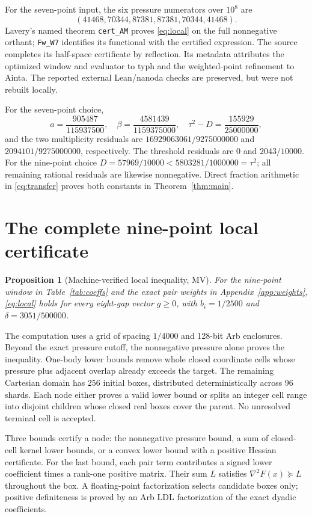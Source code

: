 \documentclass[11pt]{article}
\newtheorem{proposition}[theorem]{Proposition}
\theoremstyle{remark}\newtheorem{remark}[theorem]{Remark}
\begin{document}
For the seven-point input, the six pressure numerators over $10^8$ are
\[
(41468,70344,87381,87381,70344,41468).
\]
Lavery's named theorem
\texttt{cert\_AM} proves \eqref{eq:local} on the full nonnegative orthant;
\texttt{Fw\_W7} identifies its functional with the certified expression.
The source completes its half-space certificate by reflection. Its metadata
attributes the optimized window and evaluator to typh and the weighted-point
refinement to Ainta. The reported external Lean/nanoda checks are preserved,
but were not rebuilt locally.

For the seven-point choice,
\[
 a=\frac{905487}{115937500},\quad
 \beta=\frac{4581439}{1159375000},\quad
 \tau^2-D=\frac{155929}{25000000},
\]
and the two multiplicity residuals are
$16929063061/9275000000$ and $2094101/9275000000$, respectively.
The threshold residuals are $0$ and $2043/10000$.
For the nine-point choice $D=57969/10000<5803281/1000000=\tau^2$;
all remaining rational residuals are likewise nonnegative. Direct fraction
arithmetic in \eqref{eq:transfer} proves both constants in
Theorem~\ref{thm:main}.

\section{The complete nine-point local certificate}\label{sec:certificate}
\begin{proposition}[Machine-verified local inequality, MV]\label{prop:nine}
For the nine-point window in Table~\ref{tab:coeffs} and the exact pair
weights in Appendix~\ref{app:weights}, \eqref{eq:local} holds for every
eight-gap vector $g\ge0$, with $b_i=1/2500$ and $\delta=3051/500000$.
\end{proposition}

The computation uses a grid of spacing $1/4000$ and 128-bit Arb
enclosures. Beyond the exact pressure cutoff, the nonnegative pressure
alone proves the inequality. One-body lower bounds remove whole closed
coordinate cells whose pressure plus adjacent overlap already exceeds the
target. The remaining Cartesian domain has 256 initial boxes, distributed
deterministically across 96 shards. Each node either proves a valid lower
bound or splits an integer cell range into disjoint children whose closed
real boxes cover the parent. No unresolved terminal cell is accepted.

Three bounds certify a node: the nonnegative pressure bound, a sum of
closed-cell kernel lower bounds, or a convex lower bound with a positive
Hessian certificate. For the last bound, each pair term contributes a
signed lower coefficient times a rank-one positive matrix. Their sum $L$
satisfies $\nabla^2F(x)\succeq L$ throughout the box. A floating-point
factorization selects candidate boxes only; positive definiteness is proved
by an Arb LDL factorization of the exact dyadic coefficients.
\end{document}
